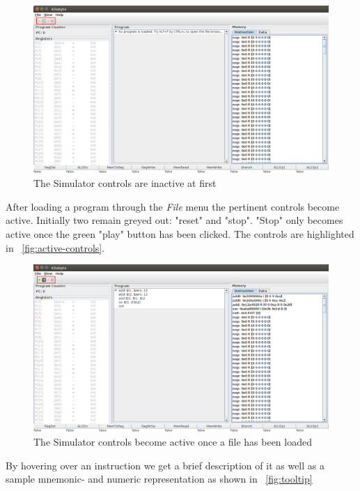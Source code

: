 \begin{figure}[H]
  \centering
  \includegraphics[width=\textwidth]{images/initial_gui_controls.png} 
  \caption{The Simulator controls are inactive at first} 
  \label{fig:inactive-controls}
\end{figure}

After loading a program through the \emph{File} menu the pertinent
controls become active. Initially two remain greyed out: "reset" and
"stop". "Stop" only becomes active once the green "play" button has been
clicked. The controls are highlighted in ~\autoref{fig:active-controls}.

\begin{figure}[H]
  \centering
  \includegraphics[width=\textwidth]{images/loaded_sw_controls.png} 
  \caption{The Simulator controls become active once a file has been loaded} 
  \label{fig:active-controls}
\end{figure}

By hovering over an instruction we get a brief description of it as
well as a sample mnemonic- and numeric representation as shown in
~\autoref{fig:tooltip}

